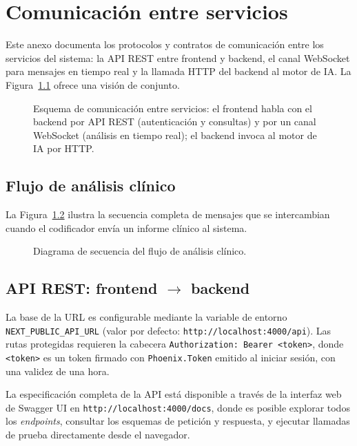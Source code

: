 \chapter{Comunicación entre servicios}
\label{cap:AnexoC}

Este anexo documenta los protocolos y contratos de comunicación entre los servicios del sistema: la API REST entre frontend y backend, el canal WebSocket para mensajes en tiempo real y la llamada HTTP del backend al motor de IA. La Figura~\ref{fig:conexion-fe-be} ofrece una visión de conjunto.

\begin{figure}[ht]
\centering
\resizebox{\textwidth}{!}{}
\caption{Esquema de comunicación entre servicios: el frontend habla con el backend por API REST (autenticación y consultas) y por un canal WebSocket (análisis en tiempo real); el backend invoca al motor de IA por HTTP.}
\label{fig:conexion-fe-be}
\end{figure}

\section{Flujo de análisis clínico}

La Figura~\ref{fig:seq-analisis} ilustra la secuencia completa de mensajes que se intercambian cuando el codificador envía un informe clínico al sistema.

\begin{figure}[ht]
\centering
\resizebox{\textwidth}{!}{}
\caption{Diagrama de secuencia del flujo de análisis clínico.}
\label{fig:seq-analisis}
\end{figure}

\section{API REST: frontend \texorpdfstring{$\rightarrow$}{->} backend}

La base de la URL es configurable mediante la variable de entorno \texttt{NEXT\_PUBLIC\_API\_URL} (valor por defecto: \texttt{http://localhost:4000/api}). Las rutas protegidas requieren la cabecera \texttt{Authorization: Bearer <token>}, donde \texttt{<token>} es un token firmado con \texttt{Phoenix.Token} emitido al iniciar sesión, con una validez de una hora.

La especificación completa de la API está disponible a través de la interfaz web de Swagger UI en \texttt{http://localhost:4000/docs}, donde es posible explorar todos los \emph{endpoints}, consultar los esquemas de petición y respuesta, y ejecutar llamadas de prueba directamente desde el navegador.

